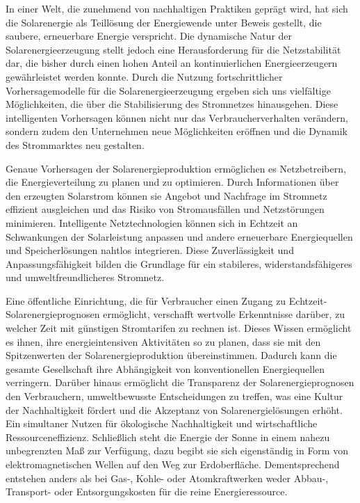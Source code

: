 \documentclass[12pt, a4paper]{article}
\begin{document}
In einer Welt, die zunehmend von nachhaltigen Praktiken geprägt wird, hat sich die Solarenergie als Teillösung der Energiewende unter Beweis gestellt, die saubere, erneuerbare Energie verspricht. Die dynamische Natur der Solarenergieerzeugung stellt jedoch eine Herausforderung für die Netzstabilität dar, die bisher durch einen hohen Anteil an kontinuierlichen Energieerzeugern gewährleistet werden konnte. Durch die Nutzung fortschrittlicher Vorhersagemodelle für die Solarenergieerzeugung ergeben sich uns vielfältige Möglichkeiten, die über die Stabilisierung des Stromnetzes hinausgehen. Diese intelligenten Vorhersagen können nicht nur das Verbraucherverhalten verändern, sondern zudem den Unternehmen neue Möglichkeiten eröffnen und die Dynamik des Strommarktes neu gestalten.

Genaue Vorhersagen der Solarenergieproduktion ermöglichen es Netzbetreibern, die Energieverteilung zu planen und zu optimieren. Durch Informationen über den erzeugten Solarstrom können sie Angebot und Nachfrage im Stromnetz effizient ausgleichen und das Risiko von Stromausfällen und Netzstörungen minimieren. Intelligente Netztechnologien können sich in Echtzeit an Schwankungen der Solarleistung anpassen und andere erneuerbare Energiequellen und Speicherlösungen nahtlos integrieren. Diese Zuverlässigkeit und Anpassungsfähigkeit bilden die Grundlage für ein stabileres, widerstandsfähigeres und umweltfreundlicheres Stromnetz.

Eine öffentliche Einrichtung, die für Verbraucher einen Zugang zu Echtzeit-Solarenergieprognosen ermöglicht, verschafft wertvolle Erkenntnisse darüber, zu welcher Zeit mit günstigen Stromtarifen zu rechnen ist. Dieses Wissen ermöglicht es ihnen, ihre energieintensiven Aktivitäten so zu planen, dass sie mit den Spitzenwerten der Solarenergieproduktion übereinstimmen. Dadurch kann die gesamte Gesellschaft ihre Abhängigkeit von konventionellen Energiequellen verringern. Darüber hinaus ermöglicht die Transparenz der Solarenergieprognosen den Verbrauchern, umweltbewusste Entscheidungen zu treffen, was eine Kultur der Nachhaltigkeit fördert und die Akzeptanz von Solarenergielösungen erhöht. Ein simultaner Nutzen für ökologische Nachhaltigkeit und wirtschaftliche Ressourceneffizienz. Schließlich steht die Energie der Sonne in einem nahezu unbegrenzten Maß zur Verfügung, dazu begibt sie sich eigenständig in Form von elektromagnetischen Wellen auf den Weg zur Erdoberfläche. Dementsprechend entstehen anders als bei Gas-, Kohle- oder Atomkraftwerken weder Abbau-, Transport- oder Entsorgungskosten für die reine Energieressource. 
\end{document}
